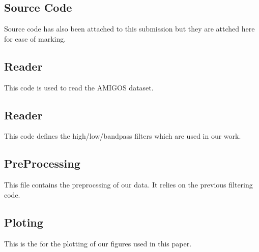 \clearpage
\onecolumn
\appendix
\begin{appendices}
  \section{Source Code}
  \noindent
  Source code has also been attached to this submission
  but they are attched here for ease of marking.

  \subsection{Reader}
  \noindent
  This code is used to read the AMIGOS dataset.
  

  \subsection{Reader}
  \noindent
  This code defines the high/low/bandpass filters
  which are used in our work.
  

  \subsection{PreProcessing}
  \noindent
  This file contains the preprocssing of our data.
  It relies on the previous filtering code.
  

  \subsection{Ploting}
  \noindent
  This is the for the plotting of our figures used in this paper.
  

\end{appendices}
